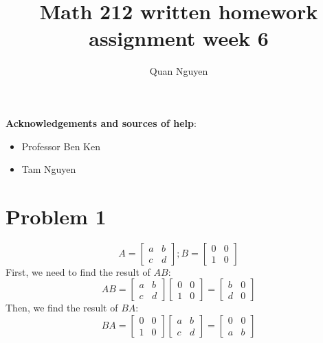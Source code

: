 \documentclass[10pt]{article}
\begin{document}
\title{Math 212 written homework assignment week 6}
\author{Quan Nguyen}
\maketitle

\bigskip
\noindent
{\bf Acknowledgements and sources of help}:
\begin{itemize}
    \item Professor Ben Ken
    \item Tam Nguyen
\end{itemize}

\bigskip
\noindent

\section*{Problem 1}
\begin{equation*}
    A = 
    \begin{bmatrix}
        a & b \\
        c & d
    \end{bmatrix};
    B = 
    \begin{bmatrix}
        0 & 0 \\
        1 & 0
    \end{bmatrix}
\end{equation*}
\noindent First, we need to find the result of $AB$:
\begin{equation*}
    AB = 
    \begin{bmatrix}
        a & b \\
        c & d
    \end{bmatrix}
    \begin{bmatrix}
        0 & 0 \\
        1 & 0
    \end{bmatrix}
    =
    \begin{bmatrix}
        b & 0 \\
        d & 0
    \end{bmatrix}
\end{equation*}
\noindent Then, we find the result of $BA$:
\begin{equation*}
    BA = 
    \begin{bmatrix}
        0 & 0 \\
        1 & 0
    \end{bmatrix}
        \begin{bmatrix}
        a & b \\
        c & d
    \end{bmatrix}
    =
    \begin{bmatrix}
        0 & 0 \\
        a & b
    \end{bmatrix}
\end{equation*}
\end{document}

